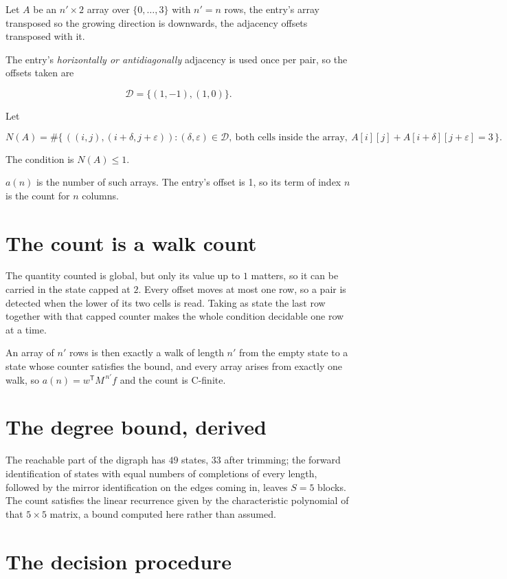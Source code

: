 \documentclass[11pt]{article}
\theoremstyle{definition}
\begin{document}
Let $A$ be an $n' \times 2$ array over $\{0,\dots,3\}$ with $n' = n$ rows, the entry's array transposed so the growing direction is downwards, the adjacency offsets transposed with it.

The entry's {\itshape horizontally or antidiagonally} adjacency is used once per pair, so the offsets taken are

\[\mathcal{D} = \{(1,-1), (1,0)\}.\]

Let

\[N(A) = \#\bigl\{\,((i,j),(i{+}\delta,j{+}\varepsilon)) : (\delta,\varepsilon) \in \mathcal{D},\ \text{both cells inside the array},\ A[i][j] + A[i{+}\delta][j{+}\varepsilon] = 3\,\bigr\}.\]

The condition is $N(A) \le 1$.

$a(n)$ is the number of such arrays. The entry's offset is 1, so its term of index $n$ is the count for $n$ columns.

\section{The count is a walk count}

The quantity counted is global, but only its value up to $1$ matters, so it can be carried in the state capped at $2$. Every offset moves at most one row, so a pair is detected when the lower of its two cells is read. Taking as state the last row together with that capped counter makes the whole condition decidable one row at a time.

An array of $n'$ rows is then exactly a walk of length $n'$ from the empty state to a state whose counter satisfies the bound, and every array arises from exactly one walk, so $a(n) = w^{\mathsf T}M^{\,n'}f$ and the count is C-finite.

\section{The degree bound, derived}

The reachable part of the digraph has $49$ states, $33$ after trimming; the forward identification of states with equal numbers of completions of every length, followed by the mirror identification on the edges coming in, leaves $S = 5$ blocks. The count satisfies the linear recurrence given by the characteristic polynomial of that $5\times5$ matrix, a bound computed here rather than assumed.

\section{The decision procedure}
\end{document}
